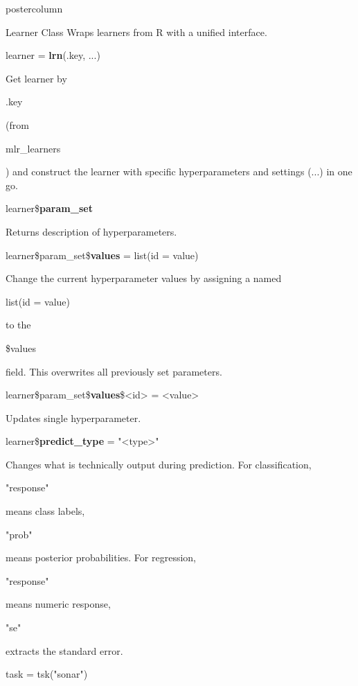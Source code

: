 \documentclass{beamer}
\newlength{\columnheight} %
\newcommand{\codeinline}[1]{\begin{codeboxinline}#1\end{codeboxinline}}
\begin{document}
\begin{frame}[fragile]{}
\begin{columns}
\begin{column}{.245\textwidth}
			\begin{beamercolorbox}[center]{postercolumn}
				\begin{minipage}{.98\textwidth}
					\parbox[t][\columnheight]{\textwidth}{
						\begin{myblock}{Learner Class}
							Wraps learners from R with a unified interface.
							\\
							\begin{codebox}
								learner = \textbf{lrn}(.key, ...)
							\end{codebox}
							Get learner by \codeinline{.key} (from \codeinline{mlr\_learners}) 
							and construct the learner with specific hyperparameters and settings (...) in one go.
							\\
							\vspace{1em}
							\begin{codebox}
								learner\$\textbf{param\_set}
							\end{codebox}
							Returns description of hyperparameters.	
							\\
							\begin{codebox}
								learner\$param\_set\$\textbf{values} = list(id = value)
							\end{codebox}
							Change the current hyperparameter values by assigning a named \codeinline{list(id = value)} to the \codeinline{\$values} field.
							This overwrites all previously set parameters.	
							\\
							\begin{codebox}
								learner\$param\_set\$\textbf{values}\$<id> = <value>
							\end{codebox}
							Updates single hyperparameter.
							\vspace{1em}
							\\
							\begin{codebox}
								learner\$\textbf{predict\_type} = "<type>"
							\end{codebox}
							Changes what is technically output during prediction. For classification, 
	                        \codeinline{"response"} means class labels, \codeinline{"prob"} means posterior probabilities.
	                        For regression, \codeinline{"response"} means numeric response, 
	                        \codeinline{"se"} extracts the standard error.
							\vspace{1em}
							\begin{codeboxexample}
								{\scriptsize
									task = tsk("sonar")\\
}
\end{codeboxexample}
\end{myblock}}
\end{minipage}
\end{beamercolorbox}
\end{column}
\end{columns}
\end{frame}
\end{document}
